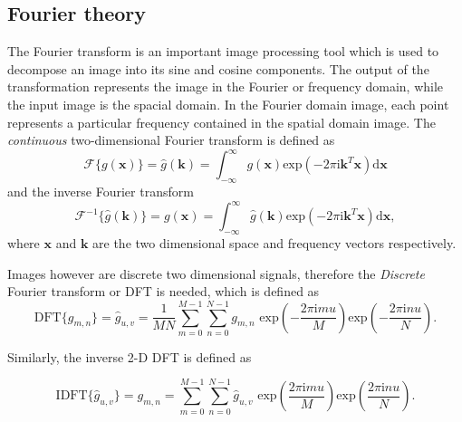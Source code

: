 		\subsection{Fourier theory}
		The Fourier transform is an important image processing tool which is used to decompose an image into its sine and cosine components. The output of the transformation represents the image in the Fourier or frequency domain, while the input image is the spacial domain. In the Fourier domain image, each point represents a particular frequency contained in the spatial domain image.
		The \textit{continuous} two-dimensional Fourier transform is defined as
		\begin{equation}
				\mathscr{F}\{ g(\mathbf{x})  \} = \hat{g}(\mathbf{k}) = 
				\int_{-\infty}^{\infty} g(\mathbf{x}) \text{exp}\left( -2 \pi \text{i} \mathbf{k}^T \mathbf{x}  \right) \text{d}\mathbf{x}
		\end{equation}
		and the inverse Fourier transform
		\begin{equation}
				\mathscr{F}^{-1}\{ \hat{g}(\mathbf{k}) \} = g(\mathbf{x}) =
				 \int_{-\infty}^{\infty} \hat{g}(\mathbf{k})
			\text{exp}\left( -2 \pi \text{i} \mathbf{k}^T \mathbf{x}  \right) \text{d}\mathbf{x},
		\end{equation}
		where $\mathbf{x}$ and $\mathbf{k}$  are the two dimensional space and frequency vectors respectively. 
		
		Images however are discrete two dimensional signals, therefore the \textit{Discrete} Fourier transform or DFT is needed, which is defined as
		\begin{equation}
			\text{DFT}\{ g_{m,n} \} = \hat{g}_{u,v} = \dfrac{1}{MN} \sum_{m=0}^{M-1} \sum_{n=0}^{N-1}
			g_{m,n} \text{ exp} \left(  - \dfrac{2 \pi \text{i} m u}{M}  \right)
						\text{exp} \left(  - \dfrac{2 \pi \text{i} n u}{N}  \right).
		\end{equation}		 

		Similarly, the inverse 2-D DFT is defined as 
		
		\begin{equation}
		 \text{IDFT}\{\hat{g}_{u,v}\} = g_{m,n} = \sum_{m=0}^{M-1} \sum_{n=0}^{N-1} \hat{g}_{u,v}
			\text{ exp} \left(   \dfrac{2 \pi \text{i} m u}{M}  \right)
			\text{exp} \left(   \dfrac{2 \pi \text{i} n u}{N}  \right).
		\end{equation}
		
		
